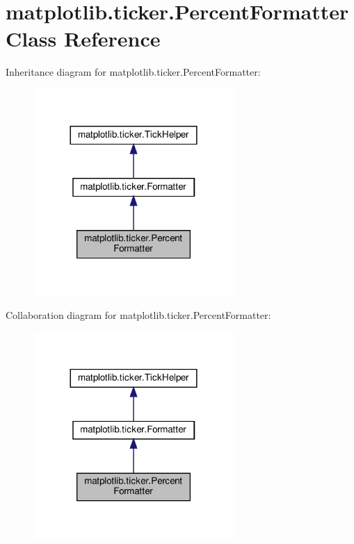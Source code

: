 \hypertarget{classmatplotlib_1_1ticker_1_1PercentFormatter}{}\section{matplotlib.\+ticker.\+Percent\+Formatter Class Reference}
\label{classmatplotlib_1_1ticker_1_1PercentFormatter}


Inheritance diagram for matplotlib.\+ticker.\+Percent\+Formatter\+:
\nopagebreak
\begin{figure}[H]
\begin{center}
\leavevmode
\includegraphics[width=216pt]{classmatplotlib_1_1ticker_1_1PercentFormatter__inherit__graph}
\end{center}
\end{figure}


Collaboration diagram for matplotlib.\+ticker.\+Percent\+Formatter\+:
\nopagebreak
\begin{figure}[H]
\begin{center}
\leavevmode
\includegraphics[width=216pt]{classmatplotlib_1_1ticker_1_1PercentFormatter__coll__graph}
\end{center}
\end{figure}
